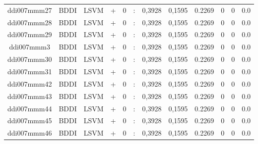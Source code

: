 \documentclass[a4paper]{article}
\begin{document}
\begin{landscape}
\begin{center}
\begin{tabular}{ |c|c|c|c|c|c|c|c|c|c|c|c|}
 
 	
 	\small{ ddi007mmm27 } & BDDI & LSVM & +  &  0 &  :  &  0,3928 & 0,1595 & 0.2269  &  0 & 0 & 0.0 \\
 	

 
 	
 	\small{ ddi007mmm28 } & BDDI & LSVM & +  &  0 &  :  &  0,3928 & 0,1595 & 0.2269  &  0 & 0 & 0.0 \\
 	

 
 	
 	\small{ ddi007mmm29 } & BDDI & LSVM & +  &  0 &  :  &  0,3928 & 0,1595 & 0.2269  &  0 & 0 & 0.0 \\
 	

 
 	
 	\small{ ddi007mmm3 } & BDDI & LSVM & +  &  0 &  :  &  0,3928 & 0,1595 & 0.2269  &  0 & 0 & 0.0 \\
 	

 
 	
 	\small{ ddi007mmm30 } & BDDI & LSVM & +  &  0 &  :  &  0,3928 & 0,1595 & 0.2269  &  0 & 0 & 0.0 \\
 	

 
 	
 	\small{ ddi007mmm31 } & BDDI & LSVM & +  &  0 &  :  &  0,3928 & 0,1595 & 0.2269  &  0 & 0 & 0.0 \\
 	

 
 	
 	\small{ ddi007mmm42 } & BDDI & LSVM & +  &  0 &  :  &  0,3928 & 0,1595 & 0.2269  &  0 & 0 & 0.0 \\
 	

 
 	
 	\small{ ddi007mmm43 } & BDDI & LSVM & +  &  0 &  :  &  0,3928 & 0,1595 & 0.2269  &  0 & 0 & 0.0 \\
 	

 
 	
 	\small{ ddi007mmm44 } & BDDI & LSVM & +  &  0 &  :  &  0,3928 & 0,1595 & 0.2269  &  0 & 0 & 0.0 \\
 	

 
 	
 	\small{ ddi007mmm45 } & BDDI & LSVM & +  &  0 &  :  &  0,3928 & 0,1595 & 0.2269  &  0 & 0 & 0.0 \\
 	

 
 	
 	\small{ ddi007mmm46 } & BDDI & LSVM & +  &  0 &  :  &  0,3928 & 0,1595 & 0.2269  &  0 & 0 & 0.0 \\
 	
 \hline
\end{tabular}
\end{center}





\end{landscape}
\end{document}
